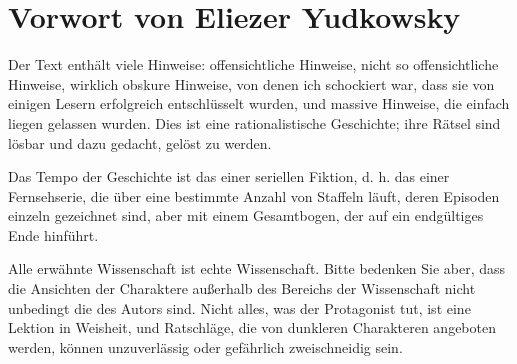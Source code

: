 \chapter*{Vorwort von Eliezer Yudkowsky}


Der Text enthält viele Hinweise: offensichtliche Hinweise, nicht so offensichtliche Hinweise, wirklich obskure Hinweise, von denen ich schockiert war, dass sie von einigen Lesern erfolgreich entschlüsselt wurden, und massive Hinweise, die einfach liegen gelassen wurden. Dies ist eine rationalistische Geschichte; ihre Rätsel sind lösbar und dazu gedacht, gelöst zu werden.

Das Tempo der Geschichte ist das einer seriellen Fiktion, d. h. das einer Fernsehserie, die über eine bestimmte Anzahl von Staffeln läuft, deren Episoden einzeln gezeichnet sind, aber mit einem Gesamtbogen, der auf ein endgültiges Ende hinführt.

Alle erwähnte Wissenschaft ist echte Wissenschaft. Bitte bedenken Sie aber, dass die Ansichten der Charaktere außerhalb des Bereichs der Wissenschaft nicht unbedingt die des Autors sind. Nicht alles, was der Protagonist tut, ist eine Lektion in Weisheit, und Ratschläge, die von dunkleren Charakteren angeboten werden, können unzuverlässig oder gefährlich zweischneidig sein.

